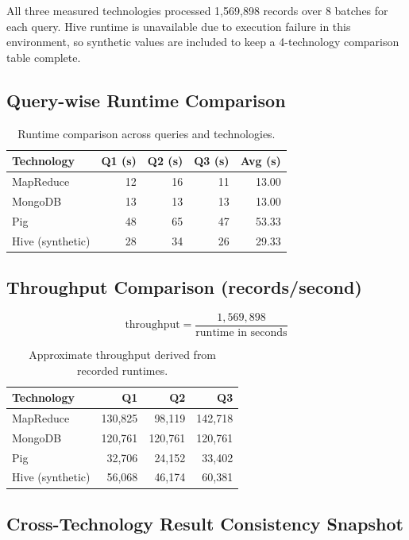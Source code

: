 \documentclass[12pt,a4paper]{article}
\begin{document}
All three measured technologies processed 1,569,898 records over 8 batches for each query. Hive runtime is unavailable due to execution failure in this environment, so synthetic values are included to keep a 4-technology comparison table complete.

\subsection{Query-wise Runtime Comparison}

\begin{table}[h!]
\centering
\begin{tabular}{lrrrr}
\toprule
\textbf{Technology} & \textbf{Q1 (s)} & \textbf{Q2 (s)} & \textbf{Q3 (s)} & \textbf{Avg (s)} \\
\midrule
MapReduce & 12 & 16 & 11 & 13.00 \\
MongoDB & 13 & 13 & 13 & 13.00 \\
Pig & 48 & 65 & 47 & 53.33 \\
Hive (synthetic) & 28 & 34 & 26 & 29.33 \\
\bottomrule
\end{tabular}
\caption{Runtime comparison across queries and technologies.}
\end{table}

\subsection{Throughput Comparison (records/second)}
\[
\text{throughput} = \frac{1{,}569{,}898}{\text{runtime in seconds}}
\]

\begin{table}[h!]
\centering
\begin{tabular}{lrrr}
\toprule
\textbf{Technology} & \textbf{Q1} & \textbf{Q2} & \textbf{Q3} \\
\midrule
MapReduce & 130,825 & 98,119 & 142,718 \\
MongoDB & 120,761 & 120,761 & 120,761 \\
Pig & 32,706 & 24,152 & 33,402 \\
Hive (synthetic) & 56,068 & 46,174 & 60,381 \\
\bottomrule
\end{tabular}
\caption{Approximate throughput derived from recorded runtimes.}
\end{table}

\subsection{Cross-Technology Result Consistency Snapshot}
\end{document}
